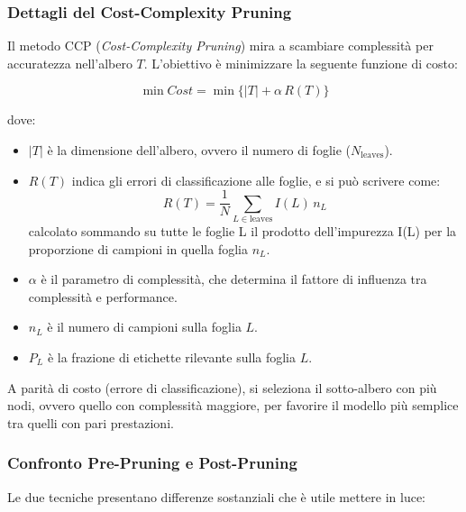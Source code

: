 \subsubsection{Dettagli del Cost-Complexity Pruning}

Il metodo CCP (\textit{Cost-Complexity Pruning}) mira a
scambiare complessità per accuratezza nell'albero $T$.
L'obiettivo è minimizzare la seguente funzione di costo:

\begin{equation}
    \min Cost = \min \{ |T| + \alpha \, R(T) \}
\end{equation}

dove:
\begin{itemize}
    \item $|T|$ è la dimensione dell'albero, ovvero il
        numero di foglie ($N_{\text{leaves}}$).
    \item $R(T)$ indica gli errori di classificazione alle
        foglie, e si può scrivere come:
        \begin{equation}
            R(T) = \frac{1}{N}\sum_{L \in \text{leaves}} I(L)\, n_L
        \end{equation}
        calcolato sommando su tutte le
    foglie L il prodotto dell'impurezza I(L) per la proporzione di campioni 
    in quella foglia $n_L$.
    \item $\alpha$ è il parametro di complessità, che
        determina il fattore di influenza tra complessità
        e performance.
    \item $n_L$ è il numero di campioni sulla foglia $L$.
    \item $P_L$ è la frazione di etichette rilevante
        sulla foglia $L$.
\end{itemize}

A parità di costo (errore di classificazione), si
seleziona il sotto-albero con più nodi, ovvero quello
con complessità maggiore, per favorire il modello più
semplice tra quelli con pari prestazioni.

\subsubsection{Confronto Pre-Pruning e Post-Pruning}

Le due tecniche presentano differenze sostanziali che
è utile mettere in luce:

